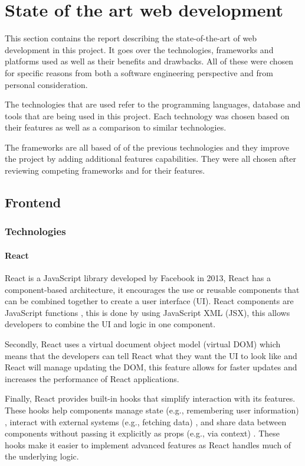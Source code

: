 \documentclass[]{project_report}
\begin{document}
\chapter{State of the art web development}

This section contains the report describing the state-of-the-art of web development in this project. It goes over the technologies, frameworks and platforms used as well as their benefits and drawbacks. All of these were chosen for specific reasons from both a software engineering perspective and from personal consideration.

The technologies that are used refer to the programming languages, database and tools that are being used in this project. Each technology was chosen based on their features as well as a comparison to similar technologies.

The frameworks are all based of of the previous technologies and they improve the project by adding additional features capabilities. They were all chosen after reviewing competing frameworks and for their features.

\section{Frontend}
\subsection{Technologies}

\subsubsection{React}

React is a JavaScript library developed by Facebook in 2013, React has a component-based architecture, it encourages the use or reusable components that can be combined together to create a user interface (UI). React components are JavaScript functions \cite{react}, this is done by using JavaScript XML (JSX), this allows developers to combine the UI and logic in one component. 

Secondly, React uses a virtual document object model (virtual DOM) which means that the developers can tell React what they want the UI to look like and React will manage updating the DOM, this feature allows for faster updates and increases the performance of React applications. 

Finally, React provides built-in hooks that simplify interaction with its features. These hooks help components manage state (e.g., remembering user information) \cite{react_hooks}, interact with external systems (e.g., fetching data) \cite{react_hooks}, and share data between components without passing it explicitly as props (e.g., via context) \cite{react_hooks}. These hooks make it easier to implement advanced features as React handles much of the underlying logic.
\end{document}
